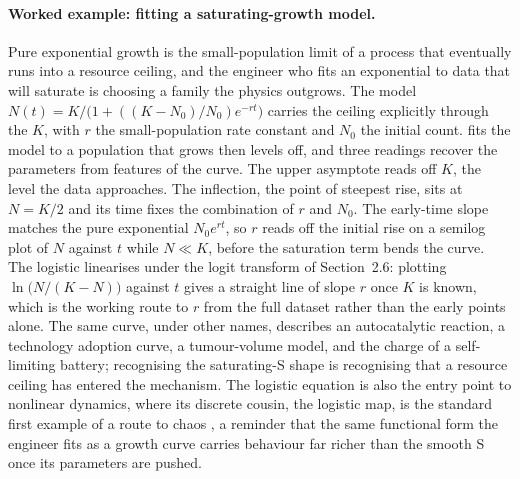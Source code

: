 \paragraph{Worked example: fitting a saturating-growth model.}
Pure exponential growth is the small-population limit of a process
that eventually runs into a resource ceiling, and the engineer who
fits an exponential to data that will saturate is choosing a family
the physics outgrows. The  model
$N(t) = K/\bigl(1 + ((K - N_{0})/N_{0}) e^{-rt}\bigr)$ carries the
ceiling explicitly through the  $K$, with
$r$ the small-population rate constant and $N_{0}$ the initial count.
 fits the model to a population that
grows then levels off, and three readings recover the parameters from
features of the curve. The upper asymptote reads off $K$, the level
the data approaches. The inflection, the point of steepest rise, sits
at $N = K/2$ and its time fixes the combination of $r$ and $N_{0}$.
The early-time slope matches the pure exponential $N_{0} e^{rt}$, so
$r$ reads off the initial rise on a semilog plot of $N$ against $t$
while $N \ll K$, before the saturation term bends the curve. The
logistic linearises under the logit transform of Section~2.6: plotting
$\ln\bigl(N/(K - N)\bigr)$ against $t$ gives a straight line of slope
$r$ once $K$ is known, which is the working route to $r$ from the full
dataset rather than the early points alone. The same curve, under
other names, describes an autocatalytic reaction, a technology
adoption curve, a tumour-volume model, and the charge of a
self-limiting battery; recognising the saturating-S shape is
recognising that a resource ceiling has entered the mechanism. The
logistic equation is also the entry point to nonlinear dynamics, where
its discrete cousin, the logistic map, is the standard first example of
a route to chaos \cite{v2c02-text:strogatz1994}, a reminder that the
same functional form the engineer fits as a growth curve carries
behaviour far richer than the smooth S once its parameters are pushed.



